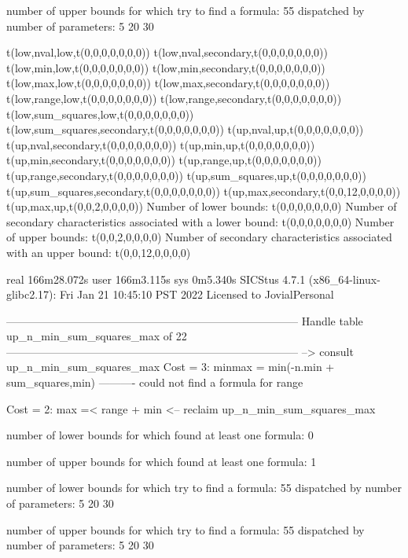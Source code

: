 number of upper bounds for which try to find a formula: 55
dispatched by number of parameters: 5  20  30

t(low,nval,low,t(0,0,0,0,0,0,0))
t(low,nval,secondary,t(0,0,0,0,0,0,0))
t(low,min,low,t(0,0,0,0,0,0,0))
t(low,min,secondary,t(0,0,0,0,0,0,0))
t(low,max,low,t(0,0,0,0,0,0,0))
t(low,max,secondary,t(0,0,0,0,0,0,0))
t(low,range,low,t(0,0,0,0,0,0,0))
t(low,range,secondary,t(0,0,0,0,0,0,0))
t(low,sum_squares,low,t(0,0,0,0,0,0,0))
t(low,sum_squares,secondary,t(0,0,0,0,0,0,0))
t(up,nval,up,t(0,0,0,0,0,0,0))
t(up,nval,secondary,t(0,0,0,0,0,0,0))
t(up,min,up,t(0,0,0,0,0,0,0))
t(up,min,secondary,t(0,0,0,0,0,0,0))
t(up,range,up,t(0,0,0,0,0,0,0))
t(up,range,secondary,t(0,0,0,0,0,0,0))
t(up,sum_squares,up,t(0,0,0,0,0,0,0))
t(up,sum_squares,secondary,t(0,0,0,0,0,0,0))
t(up,max,secondary,t(0,0,12,0,0,0,0))
t(up,max,up,t(0,0,2,0,0,0,0))
Number of lower bounds:                                             t(0,0,0,0,0,0,0)
Number of secondary characteristics associated with a lower bound:  t(0,0,0,0,0,0,0)
Number of upper bounds:                                             t(0,0,2,0,0,0,0)
Number of secondary characteristics associated with an upper bound: t(0,0,12,0,0,0,0)

real	166m28.072s
user	166m3.115s
sys	0m5.340s
SICStus 4.7.1 (x86_64-linux-glibc2.17): Fri Jan 21 10:45:10 PST 2022
Licensed to JovialPersonal


--------------------------------------------------------------------------------
Handle table up_n_min_sum_squares_max of 22
--------------------------------------------------------------------------------
--> consult up_n_min_sum_squares_max
Cost =  3:  minmax = min(-n.min + sum_squares,min)
----------
could not find a formula for range

Cost =  2:  max =< range + min
<-- reclaim up_n_min_sum_squares_max

number of lower bounds for which found at least one formula: 0

number of upper bounds for which found at least one formula: 1

number of lower bounds for which try to find a formula: 55
dispatched by number of parameters: 5  20  30

number of upper bounds for which try to find a formula: 55
dispatched by number of parameters: 5  20  30


